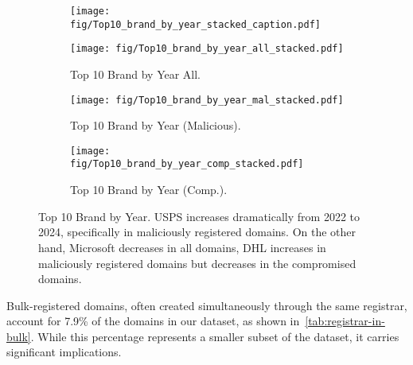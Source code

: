 \begin{figure*}[!t]
\vspace{-5px}
\centering
        \begin{subfigure}{0.9\textwidth}
            \texttt{[image: fig/Top10\_brand\_by\_year\_stacked\_caption.pdf]}
        \end{subfigure}
\centering
    \begin{subfigure}{0.32\textwidth}
        \texttt{[image: fig/Top10\_brand\_by\_year\_all\_stacked.pdf]}
        \vspace{-10px}
        \caption{Top 10 Brand by Year All.}
        \label{fig:Top10_brand_by_year_all}
    \end{subfigure}
    \begin{subfigure}{0.32\textwidth}
        \texttt{[image: fig/Top10\_brand\_by\_year\_mal\_stacked.pdf]}
        \vspace{-10px}
        \caption{Top 10 Brand by Year (Malicious).}
        \label{fig:Top10_brand_by_year_mal}
    \end{subfigure}
    \begin{subfigure}{0.32\textwidth}
        \texttt{[image: fig/Top10\_brand\_by\_year\_comp\_stacked.pdf]}
        \vspace{-10px}
        \caption{Top 10 Brand by Year (Comp.).}
        \label{fig:Top10_brand_by_year_comp}
    \end{subfigure}
    \vspace{-10px}
    \caption{Top 10 Brand by Year. USPS increases dramatically from 2022 to 2024, specifically in maliciously registered domains. On the other hand, Microsoft decreases in all domains, DHL increases in maliciously registered domains but decreases in the compromised domains.}
    \label{fig:top10_brand_by_year}
    \vspace{-10px}
\end{figure*}


Bulk-registered domains, often created simultaneously through the same registrar, account for 7.9\% of the domains in our dataset, as shown in~\autoref{tab:registrar-in-bulk}. While this percentage represents a smaller subset of the dataset, it carries significant implications.

